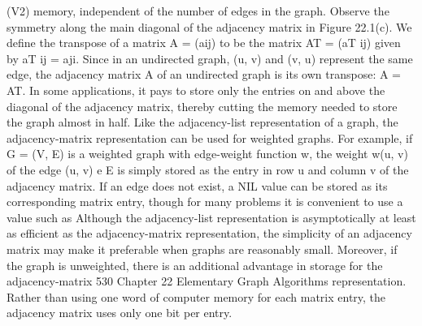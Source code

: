 (V2) memory, independent of the number of edges in the graph. Observe the symmetry along the main diagonal of the adjacency matrix in Figure 22.1(c). We define the transpose of a matrix A = (aij) to be the matrix AT = (aT ij) given by aT ij = aji. Since in an undirected graph, (u, v) and (v, u) represent the same edge, the adjacency matrix A of an undirected graph is its own transpose: A = AT. In some applications, it pays to store only the entries on and above the diagonal of the adjacency matrix, thereby cutting the memory needed to store the graph almost in half. Like the adjacency-list representation of a graph, the adjacency-matrix representation can be used for weighted graphs. For example, if G = (V, E) is a weighted graph with edge-weight function w, the weight w(u, v) of the edge (u, v) e E is simply stored as the entry in row u and column v of the adjacency matrix. If an edge does not exist, a NIL value can be stored as its corresponding matrix entry, though for many problems it is convenient to use a value such as Although the adjacency-list representation is asymptotically at least as efficient as the adjacency-matrix representation, the simplicity of an adjacency matrix may make it preferable when graphs are reasonably small. Moreover, if the graph is unweighted, there is an additional advantage in storage for the adjacency-matrix 530 Chapter 22 Elementary Graph Algorithms representation. Rather than using one word of computer memory for each matrix entry, the adjacency matrix uses only one bit per entry.

